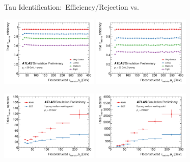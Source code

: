 \documentclass[11pt, xcolor={dvipsnames}, aspectratio=169]{beamer}
\begin{document}
\begin{frame}{Tau Identification:\ Efficiency/Rejection vs.\ \allbold{\pT}}
  \centering

  \includegraphics[width=0.35\textwidth]{tauid/pubnote/eff_vs_pt_1p}%
  \includegraphics[width=0.35\textwidth]{tauid/pubnote/eff_vs_pt_3p}%

  \includegraphics[width=0.35\textwidth]{tauid/pubnote/rej_vs_pt_1p}%
  \includegraphics[width=0.35\textwidth]{tauid/pubnote/rej_vs_pt_3p}%
\end{frame}

\end{document}
